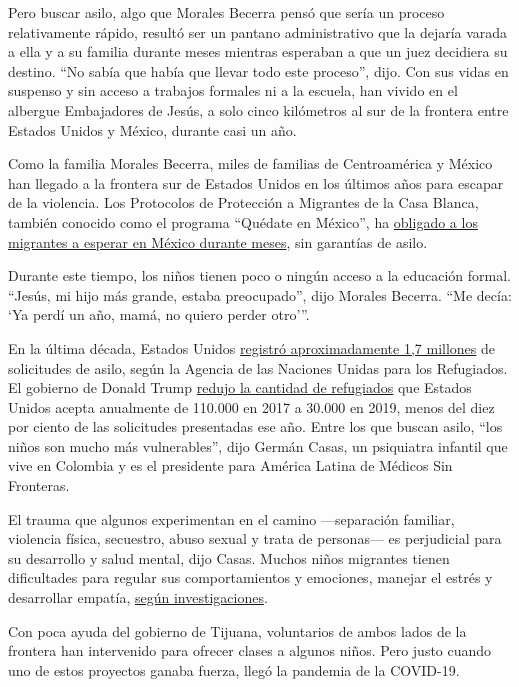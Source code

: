 Pero buscar asilo, algo que Morales Becerra pensó que sería un proceso
relativamente rápido, resultó ser un pantano administrativo que la
dejaría varada a ella y a su familia durante meses mientras esperaban a
que un juez decidiera su destino. ``No sabía que había que llevar todo
este proceso'', dijo. Con sus vidas en suspenso y sin acceso a trabajos
formales ni a la escuela, han vivido en el albergue Embajadores de
Jesús, a solo cinco kilómetros al sur de la frontera entre Estados
Unidos y México, durante casi un año.

Como la familia Morales Becerra, miles de familias de Centroamérica y
México han llegado a la frontera sur de Estados Unidos en los últimos
años para escapar de la violencia. Los Protocolos de Protección a
Migrantes de la Casa Blanca, también conocido como el programa ``Quédate
en México'', ha
\href{https://www.nytimes3xbfgragh.onion/interactive/2019/08/18/us/mexico-immigration-asylum.html}{obligado
a los migrantes a esperar en México durante meses}, sin garantías de
asilo.

Durante este tiempo, los niños tienen poco o ningún acceso a la
educación formal. ``Jesús, mi hijo más grande, estaba preocupado'', dijo
Morales Becerra. ``Me decía: `Ya perdí un año, mamá, no quiero perder
otro'''.

En la última década, Estados Unidos
\href{https://www.unhcr.org/globaltrends2019/}{registró aproximadamente
1,7 millones} de solicitudes de asilo, según la Agencia de las Naciones
Unidas para los Refugiados. El gobierno de Donald Trump
\href{https://www.migrationpolicy.org/article/refugees-and-asylees-united-states-2018}{redujo
la cantidad de refugiados} que Estados Unidos acepta anualmente de
110.000 en 2017 a 30.000 en 2019, menos del diez por ciento de las
solicitudes presentadas ese año. Entre los que buscan asilo, ``los niños
son mucho más vulnerables'', dijo Germán Casas, un psiquiatra infantil
que vive en Colombia y es el presidente para América Latina de Médicos
Sin Fronteras.

El trauma que algunos experimentan en el camino ---separación familiar,
violencia física, secuestro, abuso sexual y trata de personas--- es
perjudicial para su desarrollo y salud mental, dijo Casas. Muchos niños
migrantes tienen dificultades para regular sus comportamientos y
emociones, manejar el estrés y desarrollar empatía,
\href{https://onlinelibrary.wiley.com/doi/book/10.1002/9780470669280}{según
investigaciones}.

Con poca ayuda del gobierno de Tijuana, voluntarios de ambos lados de la
frontera han intervenido para ofrecer clases a algunos niños. Pero justo
cuando uno de estos proyectos ganaba fuerza, llegó la pandemia de la
COVID-19.

